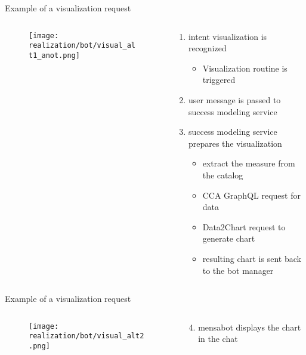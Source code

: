 \begin{frame}{Example of a visualization request}
    
    \begin{columns}
        \begin{column}[t]{0.5\textwidth}
            \begin{figure}
               
                \texttt{[image: realization/bot/visual\_alt1\_anot.png]} 
            \end{figure}
        \end{column}
        \begin{column}[t]{0.5\textwidth}
            \begin{enumerate}
              \item intent visualization is recognized
              \begin{itemize}
                \item Visualization routine is triggered
              \end{itemize}
              \item user message is passed to success modeling service
            \item success modeling service prepares the visualization
            \begin{itemize}
              \item extract the measure from the catalog
              \item CCA GraphQL request for data
              \item Data2Chart request to generate chart
              \item resulting chart is sent back to the bot manager
            \end{itemize}
            \end{enumerate}
        \end{column}
    \end{columns}
\end{frame}

\begin{frame}{Example of a visualization request}
  \begin{columns}
    \begin{column}[t]{0.5\textwidth}
      \begin{figure}
        \texttt{[image: realization/bot/visual\_alt2.png]} 
      \end{figure}
    \end{column}
    \begin{column}[]{0.5\textwidth}
      \begin{enumerate}
        \setcounter{enumi}{3}
        \item mensabot displays the chart in the chat
      \end{enumerate}
    \end{column}
\end{columns}
\end{frame}


